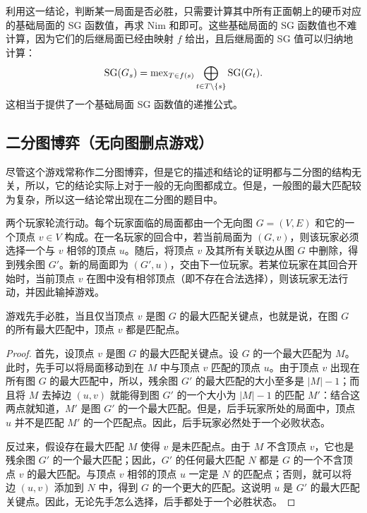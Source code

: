 利用这一结论，判断某一局面是否必胜，只需要计算其中所有正面朝上的硬币对应的基础局面的 SG 函数值，再求 Nim 和即可。这些基础局面的 SG 函数值也不难计算，因为它们的后继局面已经由映射 $f$ 给出，且后继局面的 SG 值可以归纳地计算：
$$
\operatorname{SG}(G_s) = \operatorname{mex}\limits_{T\in f(s)}\bigoplus_{t\in T\setminus\{s\}}\operatorname{SG}(G_t).
$$
这相当于提供了一个基础局面 SG 函数值的递推公式。

\subsection{二分图博弈（无向图删点游戏）}

尽管这个游戏常称作二分图博弈，但是它的描述和结论的证明都与二分图的结构无关，所以，它的结论实际上对于一般的无向图都成立。但是，一般图的最大匹配较为复杂，所以这一结论常出现在二分图的题目中。

\begin{game}[二分图博弈]
	两个玩家轮流行动。每个玩家面临的局面都由一个无向图 $G=(V,E)$ 和它的一个顶点 $v\in V$ 构成。在一名玩家的回合中，若当前局面为 $(G,v)$，则该玩家必须选择一个与 $v$ 相邻的顶点 $u$。随后，将顶点 $v$ 及其所有关联边从图 $G$ 中删除，得到残余图 $G'$。新的局面即为 $(G',u)$，交由下一位玩家。若某位玩家在其回合开始时，当前顶点 $v$ 在图中没有相邻顶点（即不存在合法选择），则该玩家无法行动，并因此输掉游戏。
\end{game}

\begin{theorem}
	游戏先手必胜，当且仅当顶点 $v$ 是图 $G$ 的最大匹配关键点，也就是说，在图 $G$ 的所有最大匹配中，顶点 $v$ 都是匹配点。
\end{theorem}

\begin{proof}
	首先，设顶点 $v$ 是图 $G$ 的最大匹配关键点。设 $G$ 的一个最大匹配为 $M$。此时，先手可以将局面移动到在 $M$ 中与顶点 $v$ 匹配的顶点 $u$。由于顶点 $v$ 出现在所有图 $G$ 的最大匹配中，所以，残余图 $G'$ 的最大匹配的大小至多是 $|M|-1$；而且将 $M$ 去掉边 $(u,v)$ 就能得到图 $G'$ 的一个大小为 $|M|-1$ 的匹配 $M'$：结合这两点就知道，$M'$ 是图 $G'$ 的一个最大匹配。但是，后手玩家所处的局面中，顶点 $u$ 并不是匹配 $M'$ 的一个匹配点。因此，后手玩家必然处于一个必败状态。
	
	反过来，假设存在最大匹配 $M$ 使得 $v$ 是未匹配点。由于 $M$ 不含顶点 $v$，它也是残余图 $G'$ 的一个最大匹配；因此，$G'$ 的任何最大匹配 $N$ 都是 $G$ 的一个不含顶点 $v$ 的最大匹配。与顶点 $v$ 相邻的顶点 $u$ 一定是 $N$ 的匹配点；否则，就可以将边 $(u,v)$ 添加到 $N$ 中，得到 $G$ 的一个更大的匹配。这说明 $u$ 是 $G'$ 的最大匹配关键点。因此，无论先手怎么选择，后手都处于一个必胜状态。
\end{proof}

